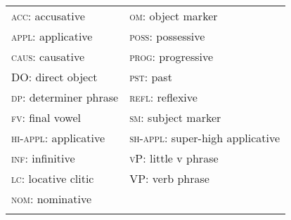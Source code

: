 \documentclass[output=paper,modfonts,nonflat]{langsci/langscibook}
\begin{document}
\begin{tabularx}{\textwidth}{XX}
\lsptoprule
\textsc{acc:} accusative & \textsc{om:} object marker\\
\textsc{appl:} applicative & \textsc{poss:} possessive\\
\textsc{caus:} causative & \textsc{prog:} progressive\\
DO\textsc{:} direct object & \textsc{pst:} past\\
\textsc{dp:} determiner phrase & \textsc{refl:} reflexive\\
\textsc{fv:} final vowel & \textsc{sm:} subject marker\\
\textsc{hi-appl:} applicative & \textsc{sh-appl:} super-high applicative\\
\textsc{inf:} infinitive & \textsc{vP:} little v phrase\\
\textsc{lc:} locative clitic & \textsc{VP:} verb phrase\\
\textsc{nom:} nominative & \\
\lspbottomrule
\end{tabularx}
\end{document}

